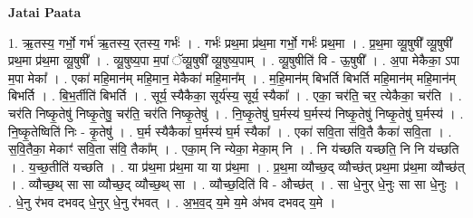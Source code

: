 \documentclass[17pt]{extarticle}
\begin{document}
\textbf{Jatai Paata} \newline

1. ऋ॒तस्य॒ गर्भो॒ गर्भ॑ ऋ॒तस्य॒ र्‌तस्य॒ गर्भः॑ । . गर्भः॑ प्रथ॒मा प्र॑थ॒मा गर्भो॒ गर्भः॑ प्रथ॒मा । . प्र॒थ॒मा व्यू॒षुषी᳚ व्यू॒षुषी᳚ प्रथ॒मा प्र॑थ॒मा व्यू॒षुषी᳚ । . व्यू॒षुष्य॒पा म॒पां ॅव्यू॒षुषी᳚ व्यू॒षुष्य॒पाम् । . व्यू॒षुषीति॑ वि - ऊ॒षुषी᳚ । . अ॒पा मेकैका॒ ऽपा म॒पा मेका᳚ । . एका॑ महि॒मान॑म् महि॒मान॒ मेकैका॑ महि॒मान᳚म् । . म॒हि॒मान॑म् बिभर्ति बिभर्ति महि॒मान॑म् महि॒मान॑म् बिभर्ति । . बि॒भ॒र्तीति॑ बिभर्ति । . सूर्य॒ स्यैकैका॒ सूर्य॑स्य॒ सूर्य॒ स्यैका᳚ । . एका॒ चर॑ति॒ चर॒ त्येकैका॒ चर॑ति । . चर॑ति निष्कृ॒तेषु॑ निष्कृ॒तेषु॒ चर॑ति॒ चर॑ति निष्कृ॒तेषु॑ । . नि॒ष्कृ॒तेषु॑ घ॒र्मस्य॑ घ॒र्मस्य॑ निष्कृ॒तेषु॑ निष्कृ॒तेषु॑ घ॒र्मस्य॑ । . नि॒ष्कृ॒तेष्विति॑ निः - कृ॒तेषु॑ । . घ॒र्म स्यैकैका॑ घ॒र्मस्य॑ घ॒र्म स्यैका᳚ । . एका॑ सवि॒ता स॑वि॒तै कैका॑ सवि॒ता । . स॒वि॒तैका॒ मेकाꣳ॑ सवि॒ता स॑वि॒ तैका᳚म् । . एका॒म् नि न्येका॒ मेका॒म् नि । . नि य॑च्छति यच्छति॒ नि नि य॑च्छति । . य॒च्छ॒तीति॑ यच्छति । . या प्र॑थ॒मा प्र॑थ॒मा या या प्र॑थ॒मा । . प्र॒थ॒मा व्यौच्छ॒द् व्यौच्छ॑त् प्रथ॒मा प्र॑थ॒मा व्यौच्छ॑त् । . व्यौच्छ॒थ् सा सा व्यौच्छ॒द् व्यौच्छ॒थ् सा । . व्यौच्छ॒दिति॑ वि - औच्छ॑त् । . सा धे॒नुर् धे॒नुः सा सा धे॒नुः । . धे॒नु र॑भव दभवद् धे॒नुर् धे॒नु र॑भवत् । . अ॒भ॒व॒द् य॒मे य॒मे अ॑भव दभवद् य॒मे । \newline
\end{document}
